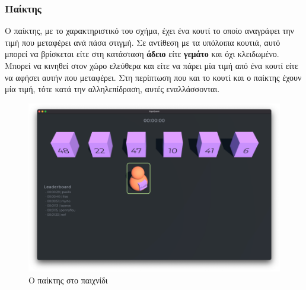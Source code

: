
\subsubsection{Παίκτης}

Ο παίκτης, με το χαρακτηριστικό του σχήμα, έχει ένα κουτί το οποίο αναγράφει την τιμή που μεταφέρει ανά πάσα στιγμή. Σε αντίθεση με τα υπόλοιπα κουτιά, αυτό μπορεί να βρίσκεται είτε στη κατάσταση \textbf{άδειο} είτε \textbf{γεμάτο} και όχι κλειδωμένο. Μπορεί να κινηθεί στον χώρο ελεύθερα και είτε να πάρει μία τιμή από ένα κουτί είτε να αφήσει αυτήν που μεταφέρει. Στη περίπτωση που και το κουτί και ο παίκτης έχουν μία τιμή, τότε κατά την αλληλεπίδραση, αυτές εναλλάσσονται.

\begin{figure}[H]
    \centering
    \includegraphics[width=0.8\linewidth]{sections/4/3/images/game_player}
    \caption{Ο παίκτης στο παιχνίδι}
    \label{fig:game_player}
\end{figure}
